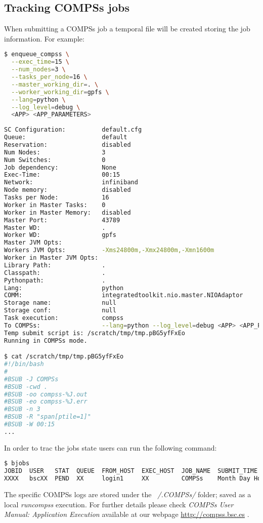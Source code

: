 \subsection{Tracking COMPSs jobs}
When submitting a COMPSs job a temporal file will be created storing the job information. For example:
\begin{lstlisting}[language=bash]
$ enqueue_compss \
  --exec_time=15 \
  --num_nodes=3 \
  --tasks_per_node=16 \
  --master_working_dir=. \
  --worker_working_dir=gpfs \
  --lang=python \
  --log_level=debug \
  <APP> <APP_PARAMETERS>
  
SC Configuration:          default.cfg
Queue:                     default
Reservation:               disabled
Num Nodes:                 3
Num Switches:              0
Job dependency:            None
Exec-Time:                 00:15
Network:                   infiniband
Node memory:               disabled
Tasks per Node:            16
Worker in Master Tasks:    0
Worker in Master Memory:   disabled
Master Port:               43789
Master WD:                 .
Worker WD:                 gpfs
Master JVM Opts:           
Workers JVM Opts:          -Xms24800m,-Xmx24800m,-Xmn1600m
Worker in Master JVM Opts: 
Library Path:              .
Classpath:                 .
Pythonpath:                .
Lang:                      python
COMM:                      integratedtoolkit.nio.master.NIOAdaptor
Storage name:              null
Storage conf:              null
Task execution:            compss
To COMPSs:                 --lang=python --log_level=debug <APP> <APP_PARAMETERS>
Temp submit script is: /scratch/tmp/tmp.pBG5yfFxEo
Running in COMPSs mode.

$ cat /scratch/tmp/tmp.pBG5yfFxEo
#!/bin/bash
#
#BSUB -J COMPSs
#BSUB -cwd . 
#BSUB -oo compss-%J.out
#BSUB -eo compss-%J.err
#BSUB -n 3
#BSUB -R "span[ptile=1]"
#BSUB -W 00:15 
...
\end{lstlisting}

In order to trac the jobs state users can run the following command:
\begin{lstlisting}[language=bash]
$ bjobs
JOBID  USER   STAT  QUEUE  FROM_HOST  EXEC_HOST  JOB_NAME  SUBMIT_TIME
XXXX   bscXX  PEND  XX     login1     XX         COMPSs    Month Day Hour
\end{lstlisting}

The specific COMPSs logs are stored under the \textit{~/.COMPSs/} folder; saved as a local \textit{runcompss} execution. For further 
details please check \textit{COMPSs User Manual: Application Execution} available at our webpage \url{http://compss.bsc.es} .
